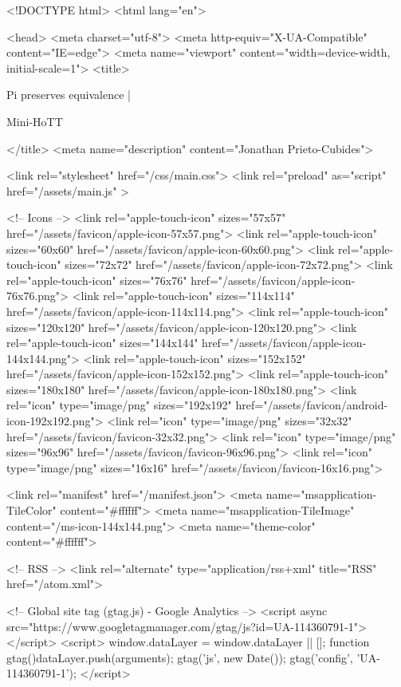 <!DOCTYPE html>
<html lang="en">

<head>
  <meta charset="utf-8">
  <meta http-equiv="X-UA-Compatible" content="IE=edge">
  <meta name="viewport" content="width=device-width, initial-scale=1">
  <title>
    
      
        Pi preserves equivalence |
      
        Mini-HoTT
    
  </title>
  <meta name="description" content="Jonathan Prieto-Cubides">

  <link rel="stylesheet" href="/css/main.css">
  <link rel="preload" as="script" href="/assets/main.js" >

  <!-- Icons -->
  <link rel="apple-touch-icon" sizes="57x57" href="/assets/favicon/apple-icon-57x57.png">
  <link rel="apple-touch-icon" sizes="60x60" href="/assets/favicon/apple-icon-60x60.png">
  <link rel="apple-touch-icon" sizes="72x72" href="/assets/favicon/apple-icon-72x72.png">
  <link rel="apple-touch-icon" sizes="76x76" href="/assets/favicon/apple-icon-76x76.png">
  <link rel="apple-touch-icon" sizes="114x114" href="/assets/favicon/apple-icon-114x114.png">
  <link rel="apple-touch-icon" sizes="120x120" href="/assets/favicon/apple-icon-120x120.png">
  <link rel="apple-touch-icon" sizes="144x144" href="/assets/favicon/apple-icon-144x144.png">
  <link rel="apple-touch-icon" sizes="152x152" href="/assets/favicon/apple-icon-152x152.png">
  <link rel="apple-touch-icon" sizes="180x180" href="/assets/favicon/apple-icon-180x180.png">
  <link rel="icon" type="image/png" sizes="192x192"  href="/assets/favicon/android-icon-192x192.png">
  <link rel="icon" type="image/png" sizes="32x32" href="/assets/favicon/favicon-32x32.png">
  <link rel="icon" type="image/png" sizes="96x96" href="/assets/favicon/favicon-96x96.png">
  <link rel="icon" type="image/png" sizes="16x16" href="/assets/favicon/favicon-16x16.png">

  <link rel="manifest" href="/manifest.json">
  <meta name="msapplication-TileColor" content="#ffffff">
  <meta name="msapplication-TileImage" content="/ms-icon-144x144.png">
  <meta name="theme-color" content="#ffffff">

  <!-- RSS -->
  <link rel="alternate" type="application/rss+xml" title="RSS" href="/atom.xml">

  <!-- Global site tag (gtag.js) - Google Analytics -->
  <script async src="https://www.googletagmanager.com/gtag/js?id=UA-114360791-1"></script>
  <script>
    window.dataLayer = window.dataLayer || [];
    function gtag(){dataLayer.push(arguments);}
    gtag('js', new Date());
    gtag('config', 'UA-114360791-1');
  </script>


